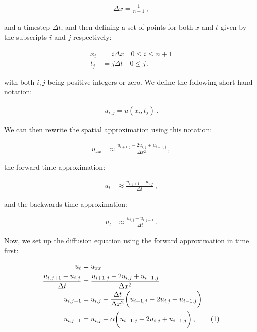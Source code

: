 \documentclass[reprint,english,notitlepage]{revtex4-1}  %
\newcommand\numberthis{\addtocounter{equation}{1}\tag{\theequation}}
\begin{document}
\begin{align*}
\Delta x = \frac{1}{n+1} \, ,
\end{align*}

and a timestep $\Delta t$, and then defining a set of points for both $x$ and $t$ given by the subscripts $i$ and $j$ respectively:

\begin{align*}
x_i &= i \Delta x \quad 0 \leq i \leq n+1 \\
t_j &= j \Delta t \quad 0 \leq j \, ,
\end{align*}

with both $i,j$ being positive integers or zero. We define the following short-hand notation:

\begin{align*}
u_{i,j} = u(x_i,t_j) \, .
\end{align*}

We can then rewrite the spatial approximation using this notation:

\begin{align*}
u_{xx} &\approx \frac{u_{i+1,j} - 2u_{i,j} + u_{i-1,j}}{\Delta x^2} \, ,
\end{align*}

the forward time approximation:

\begin{align*}
u_t &\approx \frac{u_{i,j+1} - u_{i,j}}{\Delta t} \, ,
\end{align*}

and the backwards time approximation:

\begin{align*}
u_t &\approx \frac{u_{i,j}- u_{i,j-1}}{\Delta t} \, .
\end{align*}

Now, we set up the diffusion equation using the forward approximation in time first:

\begin{align*}
u_t &= u_{xx} \\
\frac{u_{i,j+1} - u_{i,j}}{\Delta t} &= \frac{u_{i+1,j} - 2u_{i,j} + u_{i-1,j}}{\Delta x^2}  \\
u_{i,j+1} &= u_{i,j} + \frac{\Delta t}{\Delta x^2} \bigg( u_{i+1,j} - 2u_{i,j} + u_{i-1,j} \bigg) \\
u_{i,j+1} &= u_{i,j} + \alpha \bigg( u_{i+1,j} - 2u_{i,j} + u_{i-1,j} \bigg) \, ,\numberthis \label{eq:forward_euler_method}
\end{align*}
\end{document}
